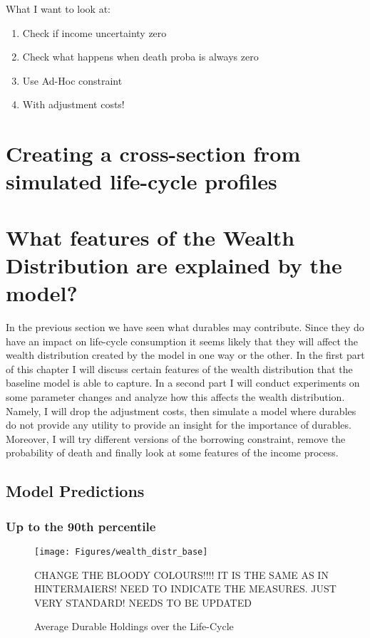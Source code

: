 \documentclass[a4paper,12pt]{article}
\begin{document}
What I want to look at:
\begin{enumerate}
\item Check if income uncertainty zero
\item Check what happens when death proba is always zero
\item Use Ad-Hoc constraint 
\item With adjustment costs!
\end{enumerate}

\label{Chapter4}

\section{Creating a cross-section from simulated life-cycle profiles}



\section{What features of the Wealth Distribution are explained by the model?}
\label{Chapter5}
In the previous section we have seen what durables may contribute. Since they do have an impact on life-cycle consumption it seems likely that they will affect the wealth distribution created by the model in one way or the other. 
In the first part of this chapter I will discuss certain features of the wealth distribution that the baseline model is able to capture. In a second part I will conduct experiments on some parameter changes and analyze how this affects the wealth distribution. Namely, I will drop the adjustment costs, then simulate a model where durables do not provide any utility to provide an insight for the importance of durables. Moreover, I will try different versions of the borrowing constraint, remove the probability of death and finally look at some features of the income process. 


\subsection{Model Predictions}

\subsubsection{Up to the 90th percentile}
\begin{figure}[!htbp]
\caption{Average Durable Holdings over the Life-Cycle} 
\label{wealth_distr_base}	%
\centering
\texttt{[image: Figures/wealth\_distr\_base]}  %

\begin{minipage}{0.8\linewidth}
\footnotesize{CHANGE THE BLOODY COLOURS!!!! IT IS THE SAME AS IN HINTERMAIERS! NEED TO INDICATE THE MEASURES. JUST VERY STANDARD! NEEDS TO BE UPDATED}
\end{minipage}

\end{figure}
\end{document}
